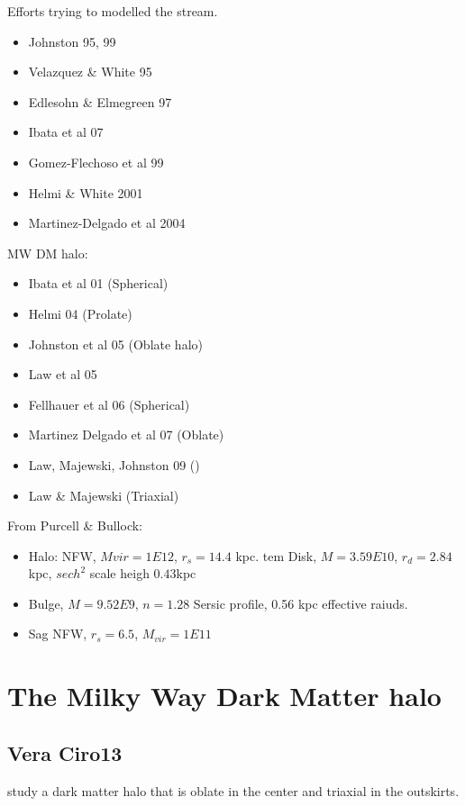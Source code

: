 \documentclass[12pt]{article}
\begin{document}
Efforts trying to modelled the stream. 

\begin{itemize}
\item Johnston 95, 99
\item Velazquez \& White 95
\item Edlesohn \& Elmegreen 97
\item Ibata et al 07
\item Gomez-Flechoso et al 99
\item Helmi \& White 2001
\item Martinez-Delgado et al 2004
\end{itemize}

MW DM halo:

\begin{itemize}
\item Ibata et al 01 (Spherical)
\item Helmi 04 (Prolate)
\item Johnston et al 05 (Oblate halo)
\item Law et al 05
\item Fellhauer et al 06 (Spherical)
\item Martinez Delgado et al 07 (Oblate)
\item Law, Majewski, Johnston 09 ()
\item Law \& Majewski (Triaxial)

\end{itemize}

From Purcell \& Bullock:

\begin{itemize}
\item Halo: NFW, $Mvir=1E12$, $r_s=14.4$ kpc.
tem Disk, $M=3.59E10$, $r_d = 2.84$kpc, $sech^2$ scale heigh $0.43$kpc
\item Bulge, $M=9.52E9$, $n=1.28$ Sersic profile, 0.56 kpc effective raiuds.
\item Sag NFW, $r_s = 6.5$, $M_{vir}=1E11$

\end{itemize}

\section{The Milky Way Dark Matter halo}\label{mw}
\subsection{Vera Ciro13}

\citep{Vera13} study a dark matter halo that is oblate in the center
 and triaxial in the outskirts. 
\end{document}
